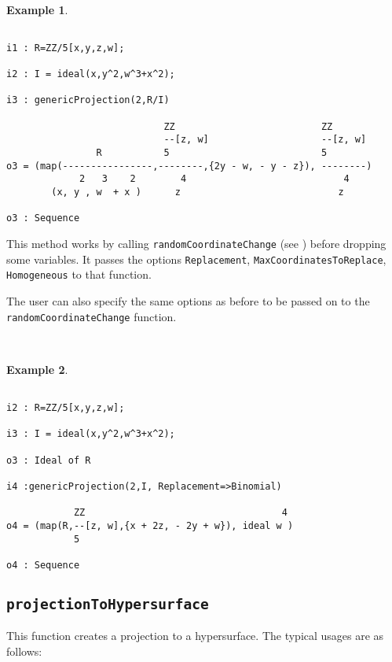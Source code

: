 \documentclass[11pt]{amsart}
\theoremstyle{definition}
\newtheorem{example}{Example}[section]
\begin{document}
~~

\begin{example}~~
	
	{{\small\color{blue}
	\begin{verbatim}

i1 : R=ZZ/5[x,y,z,w];

i2 : I = ideal(x,y^2,w^3+x^2);

i3 : genericProjection(2,R/I)	

                            ZZ                          ZZ
                            --[z, w]                    --[z, w]                        
                R           5                           5
o3 = (map(----------------,--------,{2y - w, - y - z}), --------)                       
             2   3    2        4                            4
        (x, y , w  + x )      z                            z

o3 : Sequence
	\end{verbatim}
	}}
\end{example}
	

This method works by calling {\tt randomCoordinateChange} (see ) before dropping some variables.  It passes the options {\tt Replacement}, {\tt MaxCoordinatesToReplace}, {\tt Homogeneous} to that function.

The user can also specify the same options as before to be passed on to the {\tt randomCoordinateChange} function.

~~

\begin{example}
	~~
	
	{{\small\color{blue}
	\begin{verbatim}
		
i2 : R=ZZ/5[x,y,z,w];

i3 : I = ideal(x,y^2,w^3+x^2);

o3 : Ideal of R

i4 :genericProjection(2,I, Replacement=>Binomial)

            ZZ                                   4
o4 = (map(R,--[z, w],{x + 2z, - 2y + w}), ideal w )                                     
            5

o4 : Sequence
\end{verbatim}
}}
\end{example}

\subsection{\tt projectionToHypersurface} This function creates a projection to a hypersurface. The typical usages are as follows: 
\end{document}
